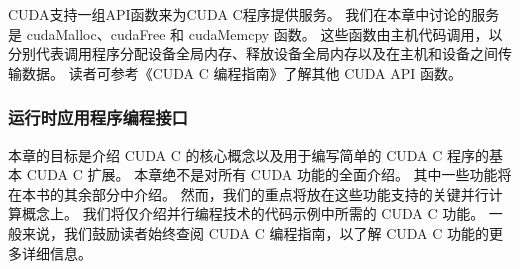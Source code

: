 CUDA支持一组API函数来为CUDA C程序提供服务。 我们在本章中讨论的服务是 cudaMalloc、cudaFree 和 cudaMemcpy 函数。 
这些函数由主机代码调用，以分别代表调用程序分配设备全局内存、释放设备全局内存以及在主机和设备之间传输数据。 
读者可参考《CUDA C 编程指南》了解其他 CUDA API 函数。


\subsubsection{运行时应用程序编程接口}
本章的目标是介绍 CUDA C 的核心概念以及用于编写简单的 CUDA C 程序的基本 CUDA C 扩展。 
本章绝不是对所有 CUDA 功能的全面介绍。 其中一些功能将在本书的其余部分中介绍。 
然而，我们的重点将放在这些功能支持的关键并行计算概念上。 我们将仅介绍并行编程技术的代码示例中所需的 CUDA C 功能。 
一般来说，我们鼓励读者始终查阅 CUDA C 编程指南，以了解 CUDA C 功能的更多详细信息。


